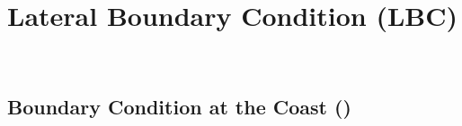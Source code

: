 \chapter{Lateral Boundary Condition (LBC) }
\label{LBC}
\minitoc

\newpage
$\ $\newline    %



\section{Boundary Condition at the Coast ()}
\label{LBC_coast}



